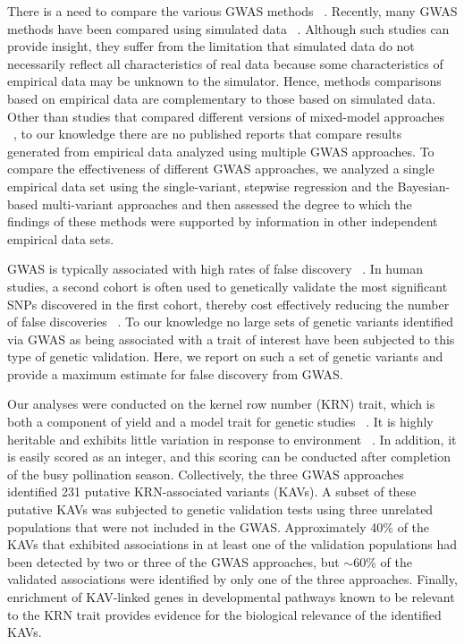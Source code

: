 \documentclass[10pt,letterpaper]{article}
\begin{document}
There is a need to compare the various GWAS methods ~\cite{Bush2012}.  Recently, many GWAS methods have been compared using simulated data ~\cite{Galesloot2014}. Although such studies can provide insight, they suffer from the limitation that simulated data do not necessarily reflect all characteristics of real data because some characteristics of empirical data may be unknown to the simulator. Hence, methods comparisons based on empirical data are complementary to those based on simulated data. Other than studies that compared different versions of mixed-model approaches ~\cite{stich2008comparison}, to our knowledge there are no published reports that compare results generated from empirical data analyzed using multiple GWAS approaches. To compare the effectiveness of different GWAS approaches, we analyzed a single empirical data set using the single-variant, stepwise regression and the Bayesian-based multi-variant approaches and then assessed the degree to which the findings of these methods were supported by information in other independent empirical data sets.

GWAS is typically associated with high rates of false discovery ~\cite{Visscher2012}. In human studies, a second cohort is often used to genetically validate the most significant SNPs discovered in the first cohort, thereby cost effectively reducing the number of false discoveries ~\cite{Sladek2007}. To our knowledge no large sets of genetic variants identified via GWAS as being associated with a trait of interest have been subjected to this type of genetic validation. Here, we report on such a set of genetic variants and provide a maximum estimate for false discovery from GWAS.  

Our analyses were conducted on the kernel row number (KRN) trait, which is both a component of yield and a model trait for genetic studies ~\cite{hallauer2010quantitative}. It is highly heritable and exhibits little variation in response to environment ~\cite{Lu2011}. In addition, it is easily scored as an integer, and this scoring can be conducted after completion of the busy pollination season. Collectively, the three GWAS approaches identified 231 putative KRN-associated variants (KAVs). A subset of these putative KAVs was subjected to genetic validation tests using three unrelated populations that were not included in the GWAS. Approximately 40\% of the KAVs that exhibited associations in at least one of the validation populations had been detected by two or three of the GWAS approaches, but $\sim$60\% of the validated associations were identified by only one of the three approaches. Finally, enrichment of KAV-linked genes in developmental pathways known to be relevant to the KRN trait provides evidence for the biological relevance of the identified KAVs. 
\end{document}
